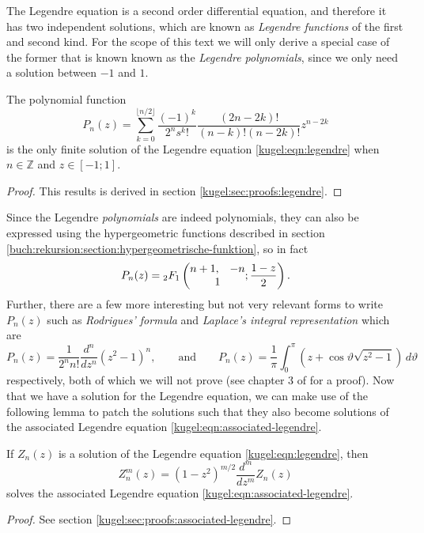 The Legendre equation is a second order differential equation, and therefore it
has two independent solutions, which are known as \emph{Legendre functions} of the
first and second kind. For the scope of this text we will only derive a special
case of the former that is known known as the \emph{Legendre polynomials}, since
we only need a solution between $-1$ and $1$.

\begin{lemma}
  \label{kugel:thm:legendre-poly}
  The polynomial function
  \[
    P_n(z) = \sum^{\lfloor n/2 \rfloor}_{k=0}
      \frac{(-1)^k}{2^n s^k!} \frac{(2n - 2k)!}{(n - k)! (n-2k)!} z^{n - 2k}
  \]
  is the only finite solution of the Legendre equation
  \eqref{kugel:eqn:legendre} when $n \in \mathbb{Z}$ and $z \in [-1; 1]$.
\end{lemma}
\begin{proof}
  This results is derived in section \ref{kugel:sec:proofs:legendre}.
\end{proof}

Since the Legendre \emph{polynomials} are indeed polynomials, they can also be
expressed using the hypergeometric functions described in section
\ref{buch:rekursion:section:hypergeometrische-funktion}, so in fact
\begin{equation}
  P_n(z) = {}_2F_1 \left( \begin{matrix}
    n + 1, & -n \\ \multicolumn{2}{c}{1}
  \end{matrix} ; \frac{1 - z}{2} \right).
\end{equation}
Further, there are a few more interesting but not very relevant forms to write
$P_n(z)$ such as \emph{Rodrigues' formula} and \emph{Laplace's integral
representation} which are
\begin{equation*}
  P_n(z) = \frac{1}{2^n n!} \frac{d^n}{dz^n} (z^2 - 1)^n,
  \qquad \text{and} \qquad
  P_n(z) = \frac{1}{\pi} \int_0^\pi \left(
    z + \cos\vartheta \sqrt{z^2 - 1}
  \right) \, d\vartheta
\end{equation*}
respectively, both of which we will not prove (see chapter 3 of
\cite{bell_special_2004} for a proof). Now that we have a solution for the
Legendre equation, we can make use of the following lemma to patch the solutions
such that they also become solutions of the associated Legendre equation
\eqref{kugel:eqn:associated-legendre}.

\begin{lemma} \label{kugel:thm:extend-legendre}
  If $Z_n(z)$ is a solution of the Legendre equation \eqref{kugel:eqn:legendre},
  then
  \begin{equation*}
    Z^m_n(z) = (1 - z^2)^{m/2} \frac{d^m}{dz^m}Z_n(z)
  \end{equation*}
  solves the associated Legendre equation \eqref{kugel:eqn:associated-legendre}.
  \nocite{bell_special_2004}
\end{lemma}
\begin{proof}
  See section \ref{kugel:sec:proofs:associated-legendre}.
\end{proof}

